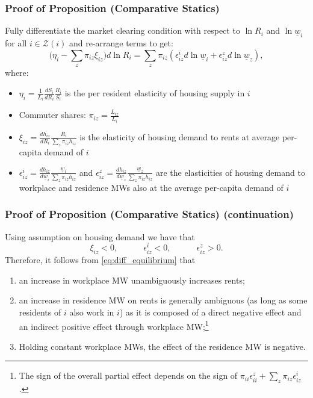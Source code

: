 \documentclass[aspectratio=169, t]{beamer}
\newcommand{\Z}{\mathcal{Z}}
\newcommand{\MW}{\underline{w}}
\begin{document}
\begin{frame}[label = proof_comp_stat]
\frametitle{Proof of Proposition (Comparative Statics)}

    Fully differentiate the market clearing condition with respect to $\ln R_i$ and 
    $\ln \MW_i$ for all $i\in\Z(i)$ and re-arrange terms to get:
    \begin{equation}\label{eq:diff_equilibrium}
        \Big(\eta_i - \sum_z \pi_{iz} \xi_{iz} \Big) d \ln R_i
        = 
        \sum_z \pi_{iz} \left(\epsilon_{iz}^i d \ln \MW_i 
                            + \epsilon_{iz}^z d \ln \MW_z \right) ,
    \end{equation}
    where:
    \begin{itemize}
        \item $\eta_i = \frac{1}{L_i} \frac{d S_i}{d R_i} \frac{R_i}{S_i}$ is the per resident elasticity 
        of housing supply in $i$
        \item Commuter shares: $\pi_{iz} = \frac{L_{iz}}{L_i}$
        \item $\xi_{iz} = \frac{d h_{iz}}{d R_i} \frac{R_i}{\sum_z \pi_{iz} h_{iz}}$ is the 
        elasticity of housing demand to rents at average per-capita demand of $i$
        \item  $\epsilon_{iz}^i = \frac{d h_{iz}}{d \MW_i} \frac{\MW_i}{\sum_z \pi_{iz} h_{iz}}$ and 
        $\epsilon_{iz}^z = \frac{d h_{iz}}{d \MW_z} \frac{\MW_z}{\sum_z \pi_{iz} h_{iz}}$ 
        are the elasticities of housing demand to workplace and residence MWs also at
         the average per-capita demand of $i$
    \end{itemize}
\end{frame}

\begin{frame}
    \frametitle{Proof of Proposition (Comparative Statics) (continuation)}
    
    Using assumption on housing demand we have that
    $$
    \xi_{iz} < 0, \quad\quad\quad \epsilon_{iz}^i < 0, \quad\quad\quad \epsilon_{iz}^z > 0 .
    $$
    \vspace{1mm}
    Therefore, it follows from \eqref{eq:diff_equilibrium} that
    \begin{enumerate}
        \item an increase in workplace MW unambiguously increases rents;
        \item an increase in residence MW on rents is generally ambiguous 
        (as long as some residents of $i$ also work in $i$) as it is composed of a direct negative 
        effect and an indirect positive effect through workplace MW;\footnote{The sign of the overall partial effect depends on the sign of 
    $\pi_{ii} \epsilon_{ii}^z + \sum_z \pi_{iz} \epsilon_{iz}^i$.}
        \item Holding constant workplace MWs, the effect of the residence MW is negative.
    \end{enumerate}    
\end{frame}
\end{document}
